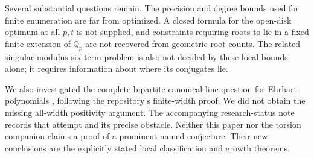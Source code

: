 \documentclass[11pt,letterpaper]{article}
\theoremstyle{definition}\newtheorem{definition}[theorem]{Definition}
\theoremstyle{remark}\newtheorem{remark}[theorem]{Remark}
\newcommand{\Qp}{\mathbb Q_p}
\begin{document}
Several substantial questions remain. The precision and degree bounds
used for finite enumeration are far from optimized. A closed formula
for the open-disk optimum at all $p,t$ is not supplied, and constraints
requiring roots to lie in a fixed finite extension of $\Qp$ are not
recovered from geometric root counts.
The related singular-modulus six-term problem is also not decided by
these local bounds alone; it requires information about where its
conjugates lie.

We also investigated the complete-bipartite canonical-line question
for Ehrhart polynomials \cite{HKM,Kolbl}, following the repository's
finite-width proof. We did not obtain the missing all-width positivity
argument. The accompanying research-status note records that attempt
and its precise obstacle. Neither this paper nor the torsion companion
claims a proof of a prominent named conjecture. Their new conclusions
are the explicitly stated local classification and growth theorems.
\end{document}

